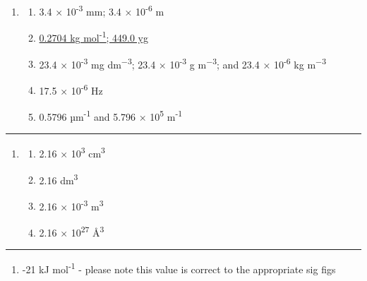\documentclass[
]{book}
\providecommand{\tightlist}{%
  \setlength{\itemsep}{0pt}\setlength{\parskip}{0pt}}
\begin{document}
\begin{enumerate}
\def\labelenumi{\arabic{enumi}.}
\item
  \begin{enumerate}
  \def\labelenumii{\alph{enumii}.}
  \tightlist
  \item
    3.4 × 10\textsuperscript{-3} mm; 3.4 × 10\textsuperscript{-6} m
  \item
    \href{https://www.youtube.com/embed/IKM6a3VxWKs}{0.2704 kg mol\textsuperscript{-1}; 449.0 yg}
  \item
    23.4 × 10\textsuperscript{-3} mg dm\textsuperscript{−3}; 23.4 × 10\textsuperscript{-3} g m\textsuperscript{−3}; and 23.4 × 10\textsuperscript{-6} kg m\textsuperscript{−3}
  \item
    17.5 × 10\textsuperscript{-6} Hz
  \item
    0.5796 µm\textsuperscript{-1} and 5.796 × 10\textsuperscript{5} m\textsuperscript{-1}
  \end{enumerate}
\end{enumerate}

\begin{center}\rule{0.5\linewidth}{0.5pt}\end{center}

\begin{enumerate}
\def\labelenumi{\arabic{enumi}.}
\setcounter{enumi}{1}
\item
  \begin{enumerate}
  \def\labelenumii{\alph{enumii}.}
  \tightlist
  \item
    2.16 × 10\textsuperscript{3} cm\textsuperscript{3}
  \item
    2.16 dm\textsuperscript{3}
  \item
    2.16 × 10\textsuperscript{-3} m\textsuperscript{3}
  \item
    2.16 × 10\textsuperscript{27} Å\textsuperscript{3}
  \end{enumerate}
\end{enumerate}

\begin{center}\rule{0.5\linewidth}{0.5pt}\end{center}

\begin{enumerate}
\def\labelenumi{\arabic{enumi}.}
\setcounter{enumi}{2}
\tightlist
\item
  -21 kJ mol\textsuperscript{-1} - please note this value is correct to the appropriate sig figs
\end{enumerate}
\end{document}
